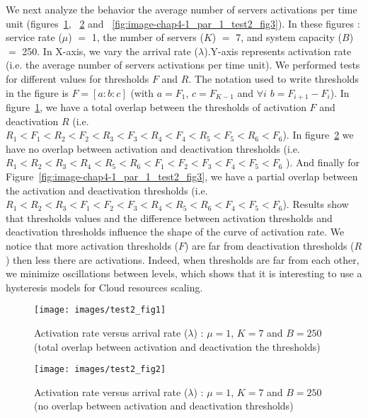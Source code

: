 \documentclass[conference]{IEEEtran}
\begin{document}
We next analyze the behavior the average number of servers activations per time unit (figures~\ref{fig:image-chap4-1_par_1_test2_fig1}, ~\ref{fig:image-chap4-1_par_1_test2_fig2} and ~\ref{fig:image-chap4-1_par_1_test2_fig3}). In these figures : service rate ($\mu$) $=$ 1, the number of servers ($K$) $=$ 7, and system capacity ($B$) $=$ 250. In X-axis, we vary the arrival rate ($\lambda$).Y-axis represents activation rate (i.e. the average number of servers activations per time unit). We performed tests for different values for thresholds $F$ and $R$. The notation used to write thresholds in the figure is $F=[a:b:c]$ (with $a=F_1$, $c=F_{K-1}$ and $\forall i$ $b=F_{i+1}-F_{i}$). In figure~\ref{fig:image-chap4-1_par_1_test2_fig1}, we have a total overlap between the thresholds of activation $F$ and deactivation $R$ (i.e. $R_1 < F_1 < R_2 < F_2 < R_3 < F_3 < R_4 < F_4 < R_5 < F_5 < R_6 < F_6$). In figure~\ref{fig:image-chap4-1_par_1_test2_fig2} we have no overlap between activation and deactivation thresholds (i.e. $R_1 < R_2 < R_3 < R_4 < R_5 < R_6 < F_1 < F_2 < F_3 < F_4 < F_5 < F_6$ ). And finally for Figure~\ref{fig:image-chap4-1_par_1_test2_fig3}, we have a partial overlap between the activation and deactivation thresholds (i.e. $R_1 < R_2 < R_3 < F_1 < F_2 < F_3 < R_4 < R_5 < R_6 < F_4 < F_5 < F_6$). Results show that thresholds values and the difference between activation thresholds and deactivation thresholds influence the shape of the curve of activation rate. We notice that more activation thresholds ($F$) are far from deactivation thresholds ($R$) then less there are activations. Indeed, when thresholds are far from each other, we minimize oscillations between levels, which shows that it is interesting to use a hysteresis models for Cloud resources scaling.

\begin{figure}[h]
\centering
\texttt{[image: images/test2\_fig1]}
\caption{Activation rate versus arrival rate ($\lambda$) : $\mu=1$, $K=7$ and $B=250$ (total overlap between activation and deactivation the thresholds)}
\label{fig:image-chap4-1_par_1_test2_fig1}
\end{figure}

\begin{figure}[h]
\centering
\texttt{[image: images/test2\_fig2]}
\caption{Activation rate versus arrival rate ($\lambda$) : $\mu=1$, $K=7$ and $B=250$ (no overlap between activation and deactivation thresholds)}
\label{fig:image-chap4-1_par_1_test2_fig2}
\end{figure}
\end{document}
